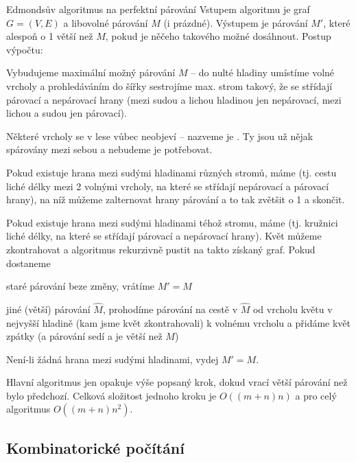 \begin{algoritmusN}{Edmondsův algoritmus na perfektní párování}
Vstupem algoritmu je graf $G=(V,E)$ a libovolné párování $M$ (i prázdné). Výstupem je párování $M'$, které alespoň o 1 větší než $M$, pokud je něčeho takového možné dosáhnout. Postup výpočtu:
\begin{penumerate}
    \item Vybudujeme maximální možný  párování $M$ -- do nulté hladiny umístíme volné vrcholy a prohledáváním do šířky sestrojíme max. strom takový, že se střídají párovací a nepárovací hrany (mezi sudou a lichou hladinou jen nepárovací, mezi lichou a sudou jen párovací).

Některé vrcholy se v lese vůbec neobjeví -- nazveme je . Ty jsou už nějak spárovány mezi sebou a nebudeme je potřebovat.
    \item Pokud existuje hrana mezi sudými hladinami různých stromů, máme  (tj. cestu liché délky mezi 2 volnými vrcholy, na které se střídají nepárovací a párovací hrany), na níž můžeme zalternovat hrany párování a to tak zvětšit o 1 a skončit.
    \item Pokud existuje hrana mezi sudými hladinami téhož stromu, máme  (tj. kružnici liché délky, na které se střídají párovací a nepárovací hrany). Květ můžeme zkontrahovat a algoritmus rekurzivně pustit na takto získaný graf. Pokud dostaneme
    \begin{penumerate}
	\item staré párování beze změny, vrátíme $M'=M$
	\item jiné (větší) párování $\hat M$, prohodíme párování na cestě v $\hat M$ od vrcholu květu v nejvyšší hladině (kam jsme květ zkontrahovali) k volnému vrcholu a přidáme květ zpátky (a párování sedí a je větší než $M$)
    \end{penumerate}
    \item Není-li žádná hrana mezi sudými hladinami, vydej $M'=M$.
\end{penumerate}
\par\medskip\noindent
Hlavní algoritmus jen opakuje výše popsaný krok, dokud vrací větší párování než bylo předchozí. Celková složitost jednoho kroku je $O((m+n)n)$ a pro celý algoritmus $O((m+n)n^2)$.
\end{algoritmusN}


\subsection{Kombinatorické počítání}

